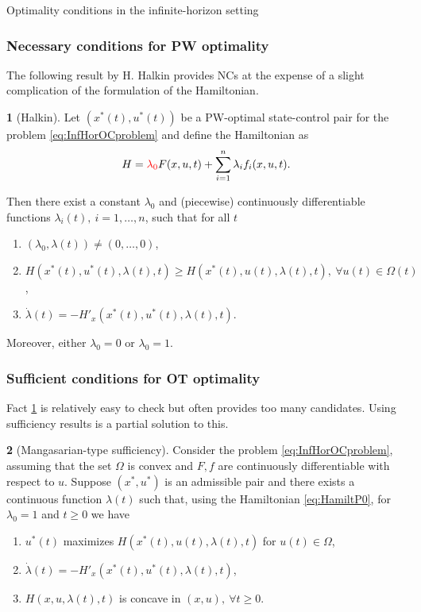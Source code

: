 \documentclass[10pt]{beamer}
\theoremstyle{definition}
\newtheorem{Fact}{\translate{Fact}}
\begin{document}
\begin{section}{Optimality conditions in the infinite-horizon setting}\label{sec:NCsSCs}

\begin{frame}[fragile]
\frametitle{Necessary conditions for PW optimality}
The following result by H. Halkin provides NCs at the expense of a slight complication of the formulation of the Hamiltonian.

\begin{Fact}[Halkin]
Let $ (x^*(t),u^*(t) ) $ be a PW-optimal state-control pair for the problem \eqref{eq:InfHorOCproblem} and define the Hamiltonian as \begin{equation}
H = \textcolor{red}{\lambda_0} F(x,u,t) + \sum_{i=1}^{n}\lambda_i f_i(x,u,t).
\label{eq:HamiltP0}
\end{equation}

Then there exist a constant $ \lambda_0 $ and (piecewise) continuously differentiable functions $ \lambda_i(t),~i=1,\ldots,n $, such that for all $ t $
\begin{enumerate}
\item $ (\lambda_0,\lambda(t)) \neq (0,\ldots,0)$,
\item $ H(x^*(t),u^*(t),\lambda(t),t )\geq H(x^*(t),u(t),\lambda(t),t ),~\forall u(t)\in \Omega(t) $,
\item $ \dot{\lambda}(t) = -H'_x(x^*(t),u^*(t),\lambda(t),t) $.
\end{enumerate}

Moreover, either $ \lambda_0=0 $ or $ \lambda_0=1 $.
\label{fc:HalkinNCs}
\end{Fact}
\end{frame}

\begin{frame}[fragile]
\frametitle{Sufficient conditions for OT optimality}
Fact \ref{fc:HalkinNCs} is relatively easy to check but often provides too many candidates. Using sufficiency results is a partial solution to this. \pause

\begin{Fact}[Mangasarian-type sufficiency]
Consider the problem \eqref{eq:InfHorOCproblem}, assuming that the set $ \Omega $ is convex and $ F,f $ are continuously differentiable with respect to $ u $. Suppose $ (x^*,u^*) $ is an admissible pair and there exists a continuous function $ \lambda(t) $ such that, using the Hamiltonian \eqref{eq:HamiltP0}, for $ \lambda_0=1 $ and $ t\geq 0 $ we have
\begin{enumerate}
\item $ u^*(t) $ maximizes $ H(x^*(t),u(t),\lambda(t),t )$ for $ u(t)\in \Omega $,
\item $ \dot{\lambda}(t) = -H'_x(x^*(t),u^*(t),\lambda(t),t) $,
\item $ H(x,u,\lambda(t),t ) $ is concave in $ (x,u),~\forall t \geq 0 $.
\end{enumerate}


\end{Fact}
\end{frame}
\end{section}
\end{document}

